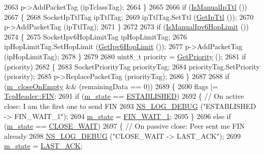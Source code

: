 \begin{DoxyCode}
2663       p->AddPacketTag (ipTclassTag);
2664     \}
2665 
2666   \textcolor{keywordflow}{if} (\hyperlink{classns3_1_1Socket_afbbd0ecd7cda631cafc80eda33aa0b2c}{IsManualIpTtl} ())
2667     \{
2668       SocketIpTtlTag ipTtlTag;
2669       ipTtlTag.SetTtl (\hyperlink{classns3_1_1Socket_adf6420d12b8a0b6a20e46c37fe48830d}{GetIpTtl} ());
2670       p->AddPacketTag (ipTtlTag);
2671     \}
2672 
2673   \textcolor{keywordflow}{if} (\hyperlink{classns3_1_1Socket_af537e44bad2f67bffe7ef6c1c86c2459}{IsManualIpv6HopLimit} ())
2674     \{
2675       SocketIpv6HopLimitTag ipHopLimitTag;
2676       ipHopLimitTag.SetHopLimit (\hyperlink{classns3_1_1Socket_ad78033887757bda28f40f4ab1f0620d0}{GetIpv6HopLimit} ());
2677       p->AddPacketTag (ipHopLimitTag);
2678     \}
2679 
2680   uint8\_t priority = \hyperlink{classns3_1_1Socket_a3e4788d61c0e841ccaa1c7fce6fda2c1}{GetPriority} ();
2681   \textcolor{keywordflow}{if} (priority)
2682     \{
2683       SocketPriorityTag priorityTag;
2684       priorityTag.SetPriority (priority);
2685       p->ReplacePacketTag (priorityTag);
2686     \}
2687 
2688   \textcolor{keywordflow}{if} (\hyperlink{classns3_1_1TcpSocketBase_a46c12a1d96840292ae2b55c3c2974214}{m\_closeOnEmpty} && (remainingData == 0))
2689     \{
2690       flags |= \hyperlink{classns3_1_1TcpHeader_a5f3d432941327854b5ad621e467479c6ad523ac42b96f79a086261246e83b5244}{TcpHeader::FIN};
2691       \textcolor{keywordflow}{if} (\hyperlink{classns3_1_1TcpSocketBase_a5db6f29272f23546e23320c06a681f3e}{m\_state} == \hyperlink{group__tcp_gga3929cdb47bdf159657fa24054aa5ca03a1826ad465d372319d1db905886de3743}{ESTABLISHED})
2692         \{ \textcolor{comment}{// On active close: I am the first one to send FIN}
2693           \hyperlink{group__logging_ga413f1886406d49f59a6a0a89b77b4d0a}{NS\_LOG\_DEBUG} (\textcolor{stringliteral}{"ESTABLISHED -> FIN\_WAIT\_1"});
2694           \hyperlink{classns3_1_1TcpSocketBase_a5db6f29272f23546e23320c06a681f3e}{m\_state} = \hyperlink{group__tcp_gga3929cdb47bdf159657fa24054aa5ca03a9f54edeb0f23302ae1c36d433b587b02}{FIN\_WAIT\_1};
2695         \}
2696       \textcolor{keywordflow}{else} \textcolor{keywordflow}{if} (\hyperlink{classns3_1_1TcpSocketBase_a5db6f29272f23546e23320c06a681f3e}{m\_state} == \hyperlink{group__tcp_gga3929cdb47bdf159657fa24054aa5ca03a812907d056aeb79789f671d657f076a3}{CLOSE\_WAIT})
2697         \{ \textcolor{comment}{// On passive close: Peer sent me FIN already}
2698           \hyperlink{group__logging_ga413f1886406d49f59a6a0a89b77b4d0a}{NS\_LOG\_DEBUG} (\textcolor{stringliteral}{"CLOSE\_WAIT -> LAST\_ACK"});
2699           \hyperlink{classns3_1_1TcpSocketBase_a5db6f29272f23546e23320c06a681f3e}{m\_state} = \hyperlink{group__tcp_gga3929cdb47bdf159657fa24054aa5ca03ac7d6d4c1e935aee5aced83a7777cbd6c}{LAST\_ACK};

\end{DoxyCode}
